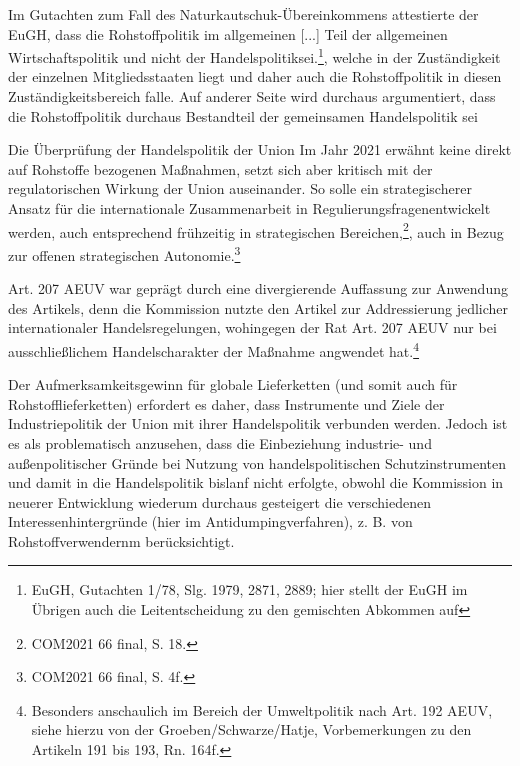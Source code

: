 \documentclass[12pt,a4paper,oneside]{book} %
\begin{document}
Im Gutachten zum Fall des Naturkautschuk-Übereinkommens attestierte der EuGH, dass die \glqq Rohstoffpolitik im allgemeinen [...] Teil der allgemeinen Wirtschaftspolitik und nicht der Handelspolitik\grqq sei.\footnote{EuGH, Gutachten 1/78, Slg. 1979, 2871, 2889; hier stellt der EuGH im Übrigen auch die Leitentscheidung zu den gemischten Abkommen auf}, welche in der Zuständigkeit der einzelnen Mitgliedsstaaten liegt und daher auch die Rohstoffpolitik in diesen Zuständigkeitsbereich falle. Auf anderer Seite wird durchaus argumentiert, dass die Rohstoffpolitik durchaus Bestandteil der gemeinsamen Handelspolitik sei\autocite{Benedek, Art. 179 EGV, Rn. 6, 2009, 40. Aufl.}

Die Überprüfung der Handelspolitik der Union Im Jahr 2021 erwähnt keine direkt auf Rohstoffe bezogenen Maßnahmen, setzt sich aber kritisch mit der regulatorischen Wirkung der Union auseinander. So solle ein \glqq strategischerer Ansatz für die internationale Zusammenarbeit in Regulierungsfragen\grqq entwickelt werden, auch entsprechend frühzeitig in strategischen Bereichen,\footnote{COM2021 66 final, S. 18.}, auch in Bezug zur offenen strategischen Autonomie.\footnote{COM2021 66 final, S. 4f.}
	
Art. 207 AEUV war geprägt durch eine divergierende Auffassung zur Anwendung des Artikels, denn die Kommission nutzte den Artikel zur Addressierung jedlicher internationaler Handelsregelungen, wohingegen der Rat Art. 207 AEUV nur bei ausschließlichem Handelscharakter der Maßnahme angwendet hat.\footnote{Besonders anschaulich im Bereich der Umweltpolitik nach Art. 192 AEUV, siehe hierzu von der Groeben/Schwarze/Hatje, Vorbemerkungen zu den Artikeln 191 bis 193, Rn. 164f.} 

Der Aufmerksamkeitsgewinn für globale Lieferketten (und somit auch für Rohstofflieferketten) erfordert es daher, dass Instrumente und Ziele der Industriepolitik der Union mit ihrer Handelspolitik verbunden werden.\autocite{	Calliess/Ruffert, EUV/AEUV, AEUV Art. 207, Rn. 132} Jedoch ist es als problematisch anzusehen, dass die Einbeziehung industrie- und außenpolitischer Gründe bei Nutzung von handelspolitischen Schutzinstrumenten und damit in die Handelspolitik bislanf nicht erfolgte, obwohl die Kommission in neuerer Entwicklung wiederum durchaus gesteigert die verschiedenen Interessenhintergründe (hier im Antidumpingverfahren), z. B. von Rohstoffverwendernm berücksichtigt.\autocite{Weiß	Das Recht der Europäischen Union, AEUV Art. 207, Rn. 164}

	
\end{document}
